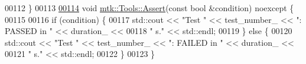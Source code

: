 \begin{DoxyCode}
00112 \}
00113 
\hypertarget{mtk__tools_8cc_source_l00114}{}\hyperlink{classmtk_1_1Tools_ac6804df469c94ab6a796fb64f1e44a89}{00114} \textcolor{keywordtype}{void} \hyperlink{classmtk_1_1Tools_ac6804df469c94ab6a796fb64f1e44a89}{mtk::Tools::Assert}(\textcolor{keyword}{const} \textcolor{keywordtype}{bool} &condition) noexcept \{
00115 
00116   \textcolor{keywordflow}{if} (condition) \{
00117     std::cout << \textcolor{stringliteral}{"Test "} << test\_number\_ << \textcolor{stringliteral}{": PASSED in "} << duration\_ <<
00118       \textcolor{stringliteral}{" s."} << std::endl;
00119   \} \textcolor{keywordflow}{else} \{
00120     std::cout << \textcolor{stringliteral}{"Test "} << test\_number\_ << \textcolor{stringliteral}{": FAILED in "} << duration\_ <<
00121       \textcolor{stringliteral}{" s."} << std::endl;
00122   \}
00123 \}
\end{DoxyCode}
